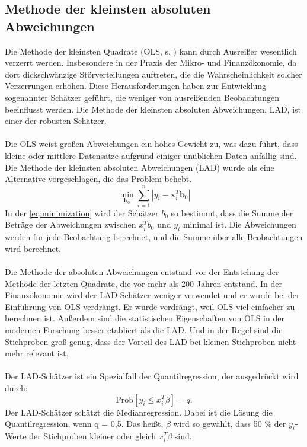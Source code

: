 \subsection{Methode der kleinsten absoluten Abweichungen}
\label{MethodeDerKleinstenAbsolutenAbweichungen}
Die Methode der kleinsten Quadrate (\ac{OLS}, s. ) kann durch Ausreißer wesentlich verzerrt werden. Insbesondere in der Praxis der Mikro- und Finanzökonomie, da dort dickschwänzige Störverteilungen auftreten, die die Wahrscheinlichkeit solcher Verzerrungen erhöhen. Diese Herausforderungen haben zur Entwicklung sogenannter  Schätzer geführt, die weniger von ausreißenden Beobachtungen beeinflusst werden. Die Methode der kleinsten absoluten Abweichungen, \ac{LAD}, ist einer der robusten Schätzer.\\\\
Die \ac{OLS} weist großen Abweichungen ein hohes Gewicht zu, was dazu führt, dass kleine oder mittlere Datensätze aufgrund einiger unüblichen Daten anfällig sind. Die Methode der kleinsten absoluten Abweichungen (\ac{LAD}) wurde als eine Alternative vorgeschlagen, die das Problem behebt. 
\begin{equation}
\label{eq:minimization}
\min_{\mathbf{b}_0} \sum_{i=1}^{n} \left| y_i - \mathbf{x}_i^T \mathbf{b}_0 \right|
\end{equation}
In der \autoref{eq:minimization} wird der Schätzer \(b_0\) so bestimmt, dass die Summe der Beträge der Abweichungen zwischen \(x_i^Tb_0\) und \(y_i\) minimal ist. Die Abweichungen werden für jede Beobachtung berechnet, und die Summe über alle Beobachtungen wird berechnet. \\\\
Die Methode der absoluten Abweichungen entstand vor der Entstehung der Methode der letzten Quadrate, die vor mehr als 200 Jahren entstand. In der Finanzökonomie wird der \ac{LAD}-Schätzer weniger verwendet und er wurde bei der Einführung von \ac{OLS} verdrängt. Er wurde verdrängt, weil \ac{OLS} viel einfacher zu berechnen ist. Außerdem sind die statistischen Eigenschaften von \ac{OLS} in der modernen Forschung besser etabliert als die \ac{LAD}. Und in der Regel sind die Stichproben groß genug, dass der Vorteil des \ac{LAD} bei kleinen Stichproben nicht mehr relevant ist. \\\\
Der \ac{LAD}-Schätzer ist ein Spezialfall der Quantilregression, der ausgedrückt wird durch: 
\begin{equation}
\label{eq:probability}
\text{Prob}[y_i \leq x_i^T\beta] = q.
\end{equation}
Der \ac{LAD}-Schätzer schätzt die Medianregression. Dabei ist die Lösung die Quantilregression, wenn q = 0,5. Das heißt, \(\beta\) wird so gewählt, dass 50 \% der \(y_i\)-Werte der Stichproben kleiner oder gleich \(x_i^T \beta\) sind. 
